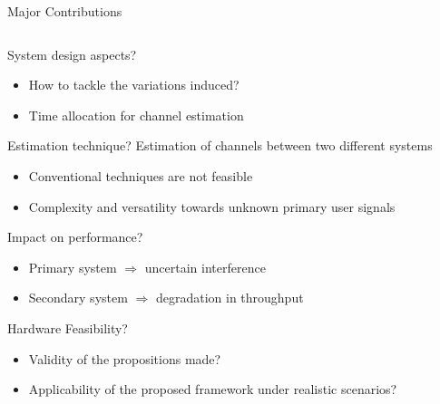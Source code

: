 \documentclass[16pt]{beamer}
\newcommand{\fs}[2]{\fontsize{#1 pt}{#2}\selectfont}
\begin{document}
\begin{frame}[t]{Major Contributions}
\begin{columns}
\begin{column}[t]{0.53\columnwidth}
				\fs{7}{8}
				\begin{block}{\scriptsize System design aspects?} %
					\begin{itemize} 
						\item How to tackle the variations induced? 
						\item Time allocation for channel estimation 
					\end{itemize}
				\end{block}
				\vspace{-1.1mm}
				{
				\begin{block}{\scriptsize Estimation technique?} %
					Estimation of channels between two different systems %
					\begin{itemize}
						\item Conventional techniques are not feasible  
						\item Complexity and versatility towards unknown primary user signals
					\end{itemize}
				\end{block}
				}
				\vspace{-1.1mm}
				{
				\begin{block}{\scriptsize Impact on performance?}%
					\begin{itemize}
						\item Primary system $\Rightarrow$ uncertain interference 
						\item Secondary system $\Rightarrow$ degradation in throughput 
					\end{itemize} 
				\end{block}
				}	
				\vspace{-1.1mm}
				{
				\begin{block}{\scriptsize Hardware Feasibility?}%
					\begin{itemize}
					\item Validity of the propositions made? 
					\item Applicability of the proposed framework under realistic scenarios? 
					\end{itemize}	
				\end{block}
				}
		\end{column}
		
		\begin{column}{0.03\columnwidth}
		\end{column}
		

\end{columns}
\end{frame}
\end{document}
